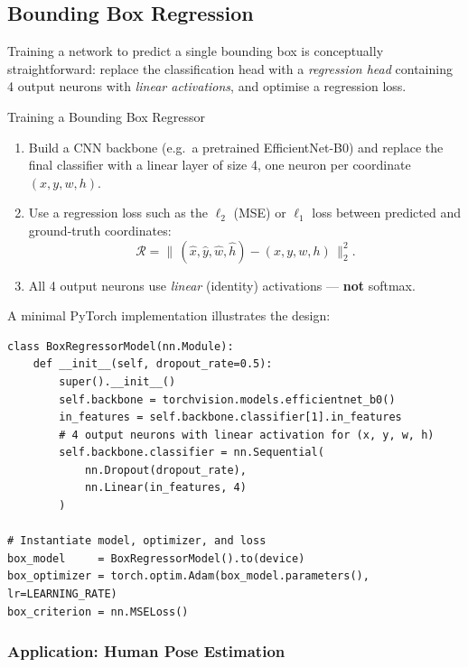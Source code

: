 \documentclass[11pt,a4paper]{article}
\begin{document}
\subsection{Bounding Box Regression}
\label{sec:bb_regression}

Training a network to predict a single bounding box is conceptually straightforward: replace the classification head with a \emph{regression head} containing 4 output neurons with \emph{linear activations}, and optimise a regression loss.

\begin{thmbox}{Training a Bounding Box Regressor}
\begin{enumerate}
  \item Build a CNN backbone (e.g.\ a pretrained EfficientNet-B0) and replace the final classifier with a linear layer of size 4, one neuron per coordinate $(x, y, w, h)$.
  \item Use a regression loss such as the $\ell_2$ (MSE) or $\ell_1$ loss between predicted and ground-truth coordinates:
  \[
    \mathcal{R} = \bigl\|\,(\hat{x}, \hat{y}, \hat{w}, \hat{h}) - (x, y, w, h)\,\bigr\|_2^2.
  \]
  \item All 4 output neurons use \emph{linear} (identity) activations — \textbf{not} softmax.
\end{enumerate}
\end{thmbox}

A minimal PyTorch implementation illustrates the design:

\begin{lstlisting}[style=pythonstyle, caption={Bounding box regressor in PyTorch}]
class BoxRegressorModel(nn.Module):
    def __init__(self, dropout_rate=0.5):
        super().__init__()
        self.backbone = torchvision.models.efficientnet_b0()
        in_features = self.backbone.classifier[1].in_features
        # 4 output neurons with linear activation for (x, y, w, h)
        self.backbone.classifier = nn.Sequential(
            nn.Dropout(dropout_rate),
            nn.Linear(in_features, 4)
        )

# Instantiate model, optimizer, and loss
box_model     = BoxRegressorModel().to(device)
box_optimizer = torch.optim.Adam(box_model.parameters(), lr=LEARNING_RATE)
box_criterion = nn.MSELoss()
\end{lstlisting}

\subsubsection{Application: Human Pose Estimation}
\end{document}
